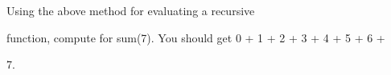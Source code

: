 Using the above method for evaluating a recursive

function, compute for sum(7). You should get 0 + 1 + 2 + 3 + 4 + 5 + 6 +

7.

